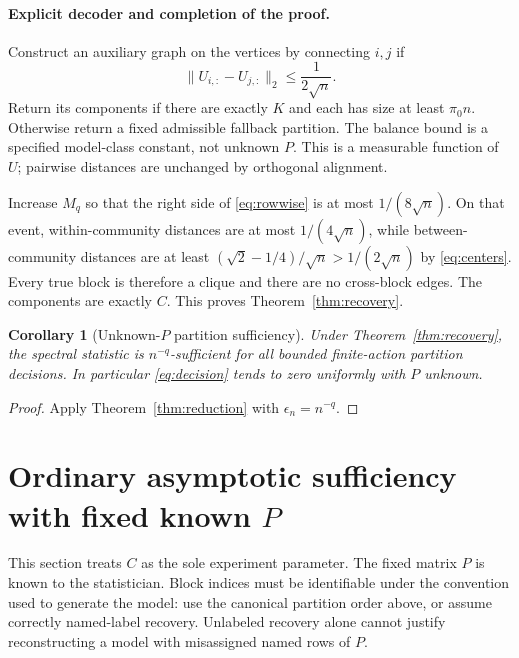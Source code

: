 \documentclass[11pt]{article}
\newtheorem{corollary}{Corollary}
\begin{document}
\paragraph{Explicit decoder and completion of the proof.}
Construct an auxiliary graph on the vertices by connecting $i,j$ if
\[
 \|U_{i,:}-U_{j,:}\|_2\le\frac1{2\sqrt n}.
\]
Return its components if there are exactly $K$ and each has size at least
$\pi_0n$. Otherwise return a fixed admissible fallback partition. The
balance bound is a specified model-class constant, not unknown $P$.
This is a measurable function of $U$; pairwise distances are unchanged
by orthogonal alignment.

Increase $M_q$ so that the right side of \eqref{eq:rowwise} is at most
$1/(8\sqrt n)$. On that event, within-community distances are at most
$1/(4\sqrt n)$, while between-community distances are at least
$(\sqrt2-1/4)/\sqrt n>1/(2\sqrt n)$ by \eqref{eq:centers}.
Every true block is therefore a clique and there are no cross-block edges.
The components are exactly $C$. This proves Theorem~\ref{thm:recovery}.

\begin{corollary}[Unknown-$P$ partition sufficiency]\label{cor:main}
Under Theorem~\ref{thm:recovery}, the spectral statistic is
$n^{-q}$-sufficient for all bounded finite-action partition decisions. In particular
\eqref{eq:decision} tends to zero uniformly with $P$ unknown.
\end{corollary}
\begin{proof}
Apply Theorem~\ref{thm:reduction} with $\epsilon_n=n^{-q}$.
\end{proof}

\section{Ordinary asymptotic sufficiency with fixed known \texorpdfstring{$P$}{P}}
This section treats $C$ as the sole experiment parameter. The fixed matrix
$P$ is known to the statistician. Block indices must be identifiable under
the convention used to generate the model: use the canonical partition
order above, or assume correctly named-label recovery. Unlabeled recovery
alone cannot justify reconstructing a model with misassigned named rows of $P$.
\end{document}
